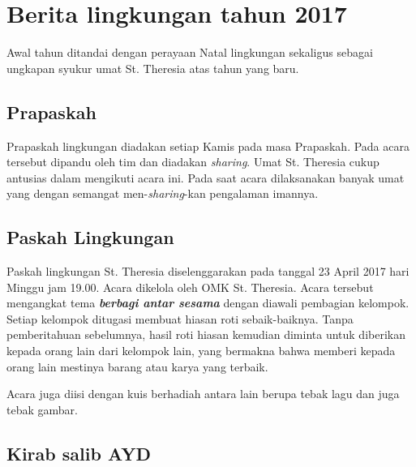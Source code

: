 

\newpage
\section{Berita lingkungan tahun 2017}
Awal tahun ditandai dengan perayaan Natal lingkungan sekaligus sebagai ungkapan syukur umat St. Theresia atas tahun yang baru.

\subsection*{Prapaskah}
Prapaskah lingkungan diadakan setiap Kamis pada masa Prapaskah. Pada acara tersebut dipandu oleh tim dan diadakan \textit{sharing}. Umat St. Theresia cukup antusias dalam mengikuti acara ini. Pada saat acara dilaksanakan banyak umat yang dengan semangat men-\textit{sharing}-kan pengalaman imannya. 

\subsection*{Paskah Lingkungan}
Paskah lingkungan St. Theresia diselenggarakan pada tanggal 23 April 2017 hari Minggu jam 19.00. Acara dikelola oleh OMK St. Theresia. Acara tersebut mengangkat tema \textit{\textbf{berbagi antar sesama}} dengan diawali pembagian kelompok. Setiap kelompok ditugasi membuat hiasan roti sebaik-baiknya. Tanpa pemberitahuan sebelumnya, hasil roti hiasan kemudian diminta untuk diberikan kepada orang lain dari kelompok lain, yang bermakna bahwa memberi kepada orang lain mestinya barang atau karya yang terbaik. 

Acara juga diisi dengan kuis berhadiah antara lain berupa tebak lagu dan juga tebak gambar.

\subsection*{Kirab salib AYD}

